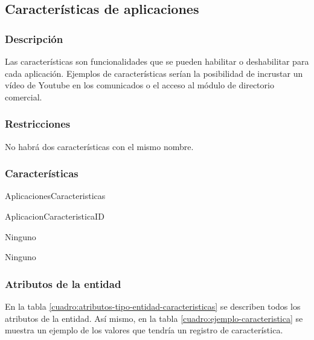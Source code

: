 \subsection{Características de aplicaciones}

\subsubsection*{Descripción}
Las características son funcionalidades que se pueden habilitar o deshabilitar para cada aplicación. Ejemplos de características serían la posibilidad de incrustar un vídeo de Youtube en los comunicados o el acceso al módulo de directorio comercial.

\subsubsection*{Restricciones}
No habrá dos características con el mismo nombre.

\subsubsection*{Características}
\begin{description}[nosep,style=multiline,labelindent=0.8cm,leftmargin=4.5cm,font=\normalfont]
    \item[Nombre] AplicacionesCaracteristicas
    \item[Id. principal] AplicacionCaracteristicaID
    \item[Id. alternativo] Ninguno
    \item[Atrib. heredados] Ninguno
\end{description}

\subsubsection*{Atributos de la entidad}
En la tabla \ref{cuadro:atributos-tipo-entidad-caracteristicas} se describen todos los atributos de la entidad. Así mismo, en la tabla \ref{cuadro:ejemplo-caracteristica} se muestra un ejemplo de los valores que tendría un registro de característica.


